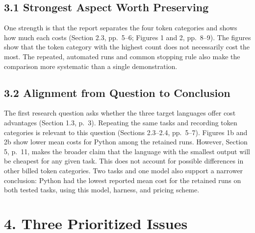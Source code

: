 \documentclass[11pt,a4paper]{extarticle}
\newcommand{\response}[1]{%
  {\color{responsegray}\fontsize{10.5}{11.8}\selectfont #1\par}\vspace{5pt}%
}
\newcommand{\responsebig}[1]{%
  {\color{responsegray}\fontsize{10.5}{11.8}\selectfont #1\par}\vspace{12pt}%
}
\begin{document}
\subsection*{3.1 Strongest Aspect Worth Preserving}
\response{One strength is that the report separates the four token categories and shows how much each costs (Section 2.3, pp.~5--6; Figures 1 and 2, pp.~8--9). The figures show that the token category with the highest count does not necessarily cost the most. The repeated, automated runs and common stopping rule also make the comparison more systematic than a single demonstration.}

\subsection*{3.2 Alignment from Question to Conclusion}
\responsebig{The first research question asks whether the three target languages offer cost advantages (Section 1.3, p.~3). Repeating the same tasks and recording token categories is relevant to this question (Sections 2.3--2.4, pp.~5--7). Figures 1b and 2b show lower mean costs for Python among the retained runs. However, Section 5, p.~11, makes the broader claim that the language with the smallest output will be cheapest for any given task. This does not account for possible differences in other billed token categories. Two tasks and one model also support a narrower conclusion: Python had the lowest reported mean cost for the retained runs on both tested tasks, using this model, harness, and pricing scheme.}

\section*{4. Three Prioritized Issues}
\end{document}
